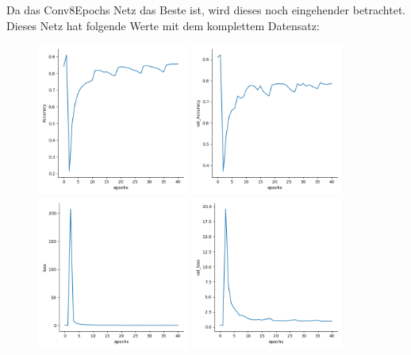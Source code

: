     Da das Conv8Epochs Netz das Beste ist, wird dieses noch eingehender betrachtet. 
    Dieses Netz hat folgende Werte mit dem komplettem Datensatz: 
    \begin{figure}[htpb]
        \includegraphics[height=5cm]{../Plots/models_03_C8E/Accuracy.png}
        \includegraphics[height=5cm]{../Plots/models_03_C8E/val_Accuracy.png}
        \includegraphics[height=5cm]{../Plots/models_03_C8E/loss.png}
        \includegraphics[height=5cm]{../Plots/models_03_C8E/val_loss.png}
    \end{figure}

